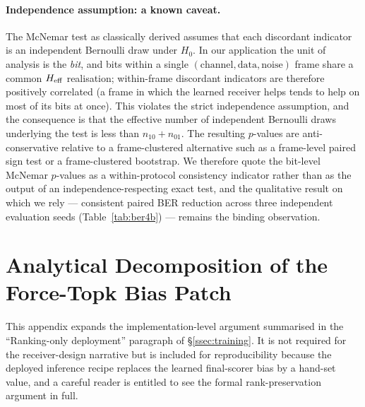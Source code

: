 \paragraph{Independence assumption: a known caveat.}
The McNemar test as classically derived assumes that each discordant indicator is an independent Bernoulli draw under $H_0$. In our application the unit of analysis is the \emph{bit}, and bits within a single $(\mathrm{channel}, \mathrm{data}, \mathrm{noise})$ frame share a common $H_{\mathrm{eff}}$ realisation; within-frame discordant indicators are therefore positively correlated (a frame in which the learned receiver helps tends to help on most of its bits at once). This violates the strict independence assumption, and the consequence is that the effective number of independent Bernoulli draws underlying the test is less than $n_{10} + n_{01}$. The resulting $p$-values are anti-conservative relative to a frame-clustered alternative such as a frame-level paired sign test or a frame-clustered bootstrap. We therefore quote the bit-level McNemar $p$-values as a within-protocol consistency indicator rather than as the output of an independence-respecting exact test, and the qualitative result on which we rely --- consistent paired BER reduction across three independent evaluation seeds (Table~\ref{tab:ber4b}) --- remains the binding observation.

\section{Analytical Decomposition of the Force-Topk Bias Patch}
\label{app:topk_patch}

This appendix expands the implementation-level argument summarised in the ``Ranking-only deployment'' paragraph of \S\ref{ssec:training}. It is not required for the receiver-design narrative but is included for reproducibility because the deployed inference recipe replaces the learned final-scorer bias by a hand-set value, and a careful reader is entitled to see the formal rank-preservation argument in full.

